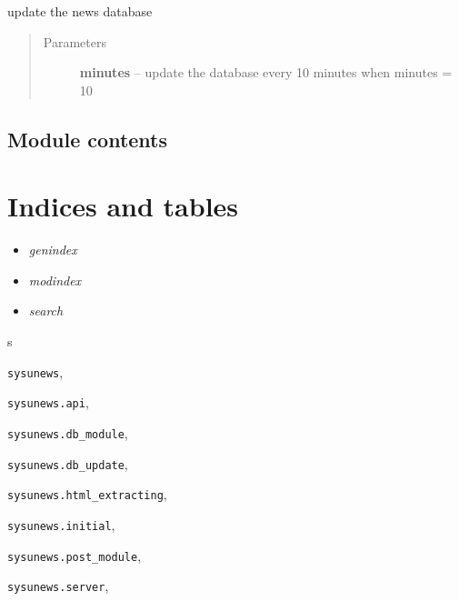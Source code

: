 \documentclass[letterpaper,10pt,english]{sphinxmanual}
\begin{document}

\begin{fulllineitems}
\label{sysunews:sysunews.server.update_news_intime}
update the news database
\begin{quote}\begin{description}
\item[{Parameters}] \leavevmode
\textbf{minutes} -- update the database every 10 minutes when minutes = 10

\end{description}\end{quote}

\end{fulllineitems}



\section{Module contents}
\label{sysunews:module-contents}\label{sysunews:module-sysunews}

\chapter{Indices and tables}
\label{index:indices-and-tables}\begin{itemize}
\item {} 
\emph{genindex}

\item {} 
\emph{modindex}

\item {} 
\emph{search}

\end{itemize}


\renewcommand{\indexname}{Python Module Index}
\begin{theindex}
\def\bigletter#1{{\Large\sffamily#1}\nopagebreak\vspace{1mm}}
\bigletter{s}
\item {\texttt{sysunews}}, \pageref{sysunews:module-sysunews}
\item {\texttt{sysunews.api}}, \pageref{sysunews:module-sysunews.api}
\item {\texttt{sysunews.db\_module}}, \pageref{sysunews:module-sysunews.db_module}
\item {\texttt{sysunews.db\_update}}, \pageref{sysunews:module-sysunews.db_update}
\item {\texttt{sysunews.html\_extracting}}, \pageref{sysunews:module-sysunews.html_extracting}
\item {\texttt{sysunews.initial}}, \pageref{sysunews:module-sysunews.initial}
\item {\texttt{sysunews.post\_module}}, \pageref{sysunews:module-sysunews.post_module}
\item {\texttt{sysunews.server}}, \pageref{sysunews:module-sysunews.server}
\end{theindex}

\renewcommand{\indexname}{Index}
\printindex
\end{document}
